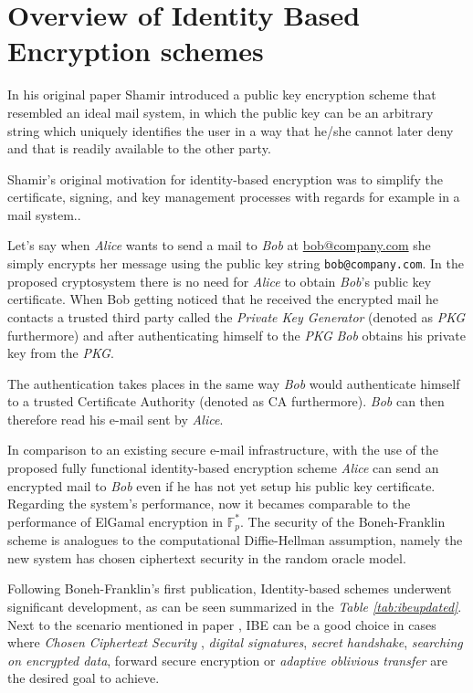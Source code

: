 \section{Overview of Identity Based Encryption schemes}
\label{sec:ibe.overview}

In his original paper \cite{Shamir41} Shamir introduced a public key encryption
scheme that resembled an ideal mail system, in which the public key can be an
arbitrary string which  uniquely identifies the user in a way that he/she
cannot later deny and that is readily available to the other party.\cite{Shamir41}

Shamir's original motivation for identity-based encryption was to simplify the
certificate, signing, and key management processes with regards
for example in a mail system.\cite{BF01}.

Let's say when \textit{Alice} wants to send  a mail to \textit{Bob} at \url{bob@company.com}
she simply encrypts her message using the public key string \lstinline{bob@company.com}. 
In the proposed cryptosystem there is no need for \textit{Alice} to obtain \textit{Bob}’s public key
certificate. When Bob getting noticed that he received the encrypted mail he contacts a trusted
third party called the \textit{Private Key Generator} (denoted as \textit{PKG}  furthermore) and 
after authenticating himself to the \textit{PKG} \textit{Bob} obtains his private key
from the \textit{PKG}. \cite{BF01}

The authentication takes places in the same way \textit{Bob} would authenticate
himself to a trusted Certificate Authority (denoted as CA furthermore).
\textit{Bob} can then therefore read his e-mail sent by \textit{Alice}.

In comparison to an existing secure e-mail infrastructure,
with the use of the proposed fully functional
identity-based encryption scheme\cite{BF01}
\textit{Alice} can send an encrypted mail to \textit{Bob} even if he has not yet
setup his public key certificate. Regarding the system's performance,
now it becames comparable to the performance of
ElGamal encryption\cite{cryptosys.elgamal} in $\mathbb{F}^{*}_p$. The security of the
Boneh-Franklin scheme is analogues to the computational Diffie-Hellman assumption\cite{crypto.cdhddh},
namely the new system has chosen ciphertext security in the random oracle model\cite{Bellare1993}.

Following Boneh-Franklin's first publication, Identity-based schemes underwent significant development, as can be seen summarized in the \textit{Table \ref{tab:ibeupdated}}. Next to the scenario mentioned in paper \cite{Shamir41}, IBE can be a good choice in cases where \textit{Chosen Ciphertext Security}\cite{CHK04, BK04, BMW05}
, \textit{digital signatures}, \textit{secret handshake}, \textit{searching on encrypted data}\cite{BDOP04,AB05}, forward secure encryption \cite{CHK03, BBG05}or \textit{adaptive oblivious transfer} \cite{GH08} are the desired goal to achieve.

